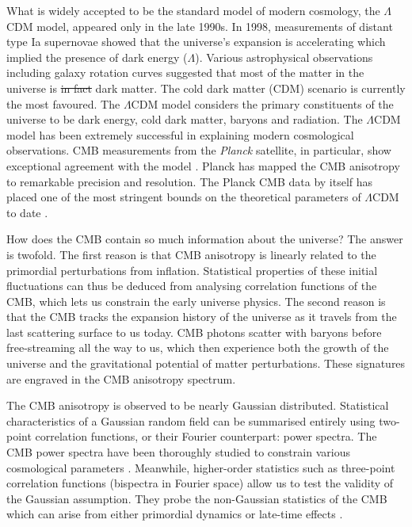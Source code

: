 \documentclass[a4paper,12pt,times,custombib,print,index]{Classes/PhDThesisPSnPDF} %
\providecommand{\DIFadd}[1]{{\protect\color{blue}\uwave{#1}}} %
\providecommand{\DIFdel}[1]{{\protect\color{red}\sout{#1}}}                      %
\providecommand{\DIFaddbegin}{} %
\providecommand{\DIFaddend}{} %
\providecommand{\DIFdelbegin}{} %
\providecommand{\DIFdelend}{} %
\newcommand{\DIFscaledelfig}{0.5}
\newlength{\DIFdelgraphicswidth} %
\newlength{\DIFdelgraphicsheight} %
\newcommand{\DIFaddincludegraphics}[2][]{{\color{blue}\fbox{\DIFOincludegraphics[#1]{#2}}}} %
\newcommand{\DIFdelincludegraphics}[2][]{%
\sbox{\DIFdelgraphicsbox}{\DIFOincludegraphics[#1]{#2}}%
\settoboxwidth{\DIFdelgraphicswidth}{\DIFdelgraphicsbox} %
\settoboxtotalheight{\DIFdelgraphicsheight}{\DIFdelgraphicsbox} %
\scalebox{\DIFscaledelfig}{%
\parbox[b]{\DIFdelgraphicswidth}{\usebox{\DIFdelgraphicsbox}\\[-\baselineskip] \rule{\DIFdelgraphicswidth}{0em}}\llap{\resizebox{\DIFdelgraphicswidth}{\DIFdelgraphicsheight}{%
\setlength{\unitlength}{\DIFdelgraphicswidth}%
\begin{picture}(1,1)%
\thicklines\linethickness{2pt} %
{\color[rgb]{1,0,0}\put(0,0){\framebox(1,1){}}}%
{\color[rgb]{1,0,0}\put(0,0){\line( 1,1){1}}}%
{\color[rgb]{1,0,0}\put(0,1){\line(1,-1){1}}}%
\end{picture}%
}\hspace*{3pt}}} %
} %
\DeclareRobustCommand{\DIFaddbegin}{\DIFOaddbegin \let\includegraphics\DIFaddincludegraphics} %
\DeclareRobustCommand{\DIFaddend}{\DIFOaddend \let\includegraphics\DIFOincludegraphics} %
\DeclareRobustCommand{\DIFdelbegin}{\DIFOdelbegin \let\includegraphics\DIFdelincludegraphics} %
\DeclareRobustCommand{\DIFdelend}{\DIFOaddend \let\includegraphics\DIFOincludegraphics} %
\begin{document}
What is widely accepted to be the standard model of modern cosmology, the $\Lambda$CDM model, appeared only in the late 1990s. In 1998, measurements of distant type Ia supernovae showed that the universe's expansion is accelerating \DIFaddbegin \cite{Riess1998acceleration} \DIFaddend which implied the presence of dark energy ($\Lambda$). Various astrophysical observations including galaxy rotation curves suggested \DIFaddbegin \DIFadd{the existence of dark matter }\cite{Rubin1980rotationcurves}\DIFadd{, and }\DIFaddend that most of the matter in the universe is \DIFdelbegin \DIFdel{in fact }\DIFdelend dark matter. The cold dark matter (CDM) scenario is currently the most favoured. The $\Lambda$CDM model considers the primary constituents of the universe to be dark energy, cold dark matter, baryons and radiation. The $\Lambda$CDM model has been extremely successful in explaining modern cosmological observations. CMB measurements from the \textit{Planck} satellite, in particular, show exceptional agreement with the model \DIFaddbegin \cite{PlanckCollaboration2018Parameters}\DIFaddend . Planck has mapped the CMB anisotropy to remarkable precision and resolution. The Planck CMB data by itself has placed one of the most stringent bounds on the theoretical parameters of $\Lambda$CDM to date \DIFaddbegin \cite{PlanckCollaboration2018Parameters,PlanckCollaboration2018inflation}\DIFaddend .

How does the CMB contain so much information about the universe? The answer is twofold. The first reason is that CMB anisotropy is linearly related to the primordial perturbations from inflation. Statistical properties of these initial fluctuations can thus be deduced from analysing correlation functions of the CMB, which lets us constrain the early universe physics. The second reason is that the CMB tracks the expansion history of the universe as it travels from the last scattering surface to us today. CMB photons scatter with baryons before free-streaming all the way to us, which then experience both the growth of the universe and the gravitational potential of matter perturbations. These signatures are engraved in the CMB anisotropy spectrum.

The CMB anisotropy is observed to be nearly Gaussian distributed. Statistical characteristics of a Gaussian random field can be summarised entirely using two-point correlation functions, or their Fourier counterpart: power spectra. The CMB power spectra have been thoroughly studied to constrain various cosmological parameters \DIFaddbegin \cite{Hinshaw2003wmapPower,Dunkley2011act,PlanckCollaboration2018power,BicepKeck2021}\DIFaddend . Meanwhile, higher-order statistics such as three-point correlation functions (bispectra in Fourier space) allow us to test the validity of the Gaussian assumption. They probe the non-Gaussian statistics of the CMB which can arise from either primordial dynamics or late-time effects \DIFaddbegin \cite{Lewis2011lensing}\DIFaddend .
\end{document}
